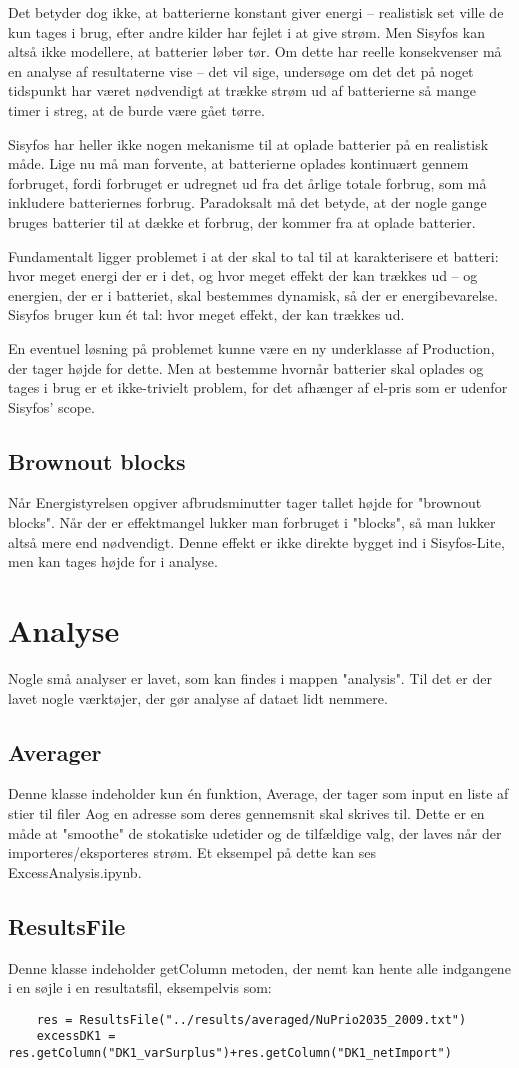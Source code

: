 \documentclass{article}
\begin{document}
Det betyder dog ikke, at batterierne konstant giver energi -- realistisk set ville de kun tages i brug, efter andre kilder har fejlet i at give strøm. Men Sisyfos kan altså ikke modellere, at batterier løber tør. Om dette har reelle konsekvenser må en analyse af resultaterne vise -- det vil sige, undersøge om det det på noget tidspunkt har været nødvendigt at trække strøm ud af batterierne så mange timer i streg, at de burde være gået tørre.

Sisyfos har heller ikke nogen mekanisme til at oplade batterier på en realistisk måde. Lige nu må man forvente, at batterierne oplades kontinuært gennem forbruget, fordi forbruget er udregnet ud fra det årlige totale forbrug, som må inkludere batteriernes forbrug. Paradoksalt må det betyde, at der nogle gange bruges batterier til at dække et forbrug, der kommer fra at oplade batterier.

Fundamentalt ligger problemet i at der skal to tal til at karakterisere et batteri: hvor meget energi der er i det, og hvor meget effekt der kan trækkes ud -- og energien, der er i batteriet, skal bestemmes dynamisk, så der er energibevarelse. Sisyfos bruger kun ét tal: hvor meget effekt, der kan trækkes ud. 

En eventuel løsning på problemet kunne være en ny underklasse af Production, der tager højde for dette. Men at bestemme hvornår batterier skal oplades og tages i brug er et ikke-trivielt problem, for det afhænger af el-pris som er udenfor Sisyfos' scope.
\subsection{Brownout blocks}
Når Energistyrelsen opgiver afbrudsminutter tager tallet højde for "brownout blocks". Når der er effektmangel lukker man forbruget i "blocks", så man lukker altså mere end nødvendigt. Denne effekt er ikke direkte bygget ind i Sisyfos-Lite, men kan tages højde for i analyse. 
\section{Analyse}
Nogle små analyser er lavet, som kan findes i mappen "analysis". Til det er der lavet nogle værktøjer, der gør analyse af dataet lidt nemmere. 
\subsection{Averager}
Denne klasse indeholder kun én funktion, Average, der tager som input en liste af stier til filer Aog en adresse som deres gennemsnit skal skrives til. Dette er en måde at "smoothe" de stokatiske udetider og de tilfældige valg, der laves når der importeres/eksporteres strøm. Et eksempel på dette kan ses ExcessAnalysis.ipynb.
\subsection{ResultsFile}
Denne klasse indeholder getColumn metoden, der nemt kan hente alle indgangene i en søjle i en resultatsfil, eksempelvis som:
\begin{verbatim}
    res = ResultsFile("../results/averaged/NuPrio2035_2009.txt")
    excessDK1 = res.getColumn("DK1_varSurplus")+res.getColumn("DK1_netImport")
\end{verbatim}
\end{document}
